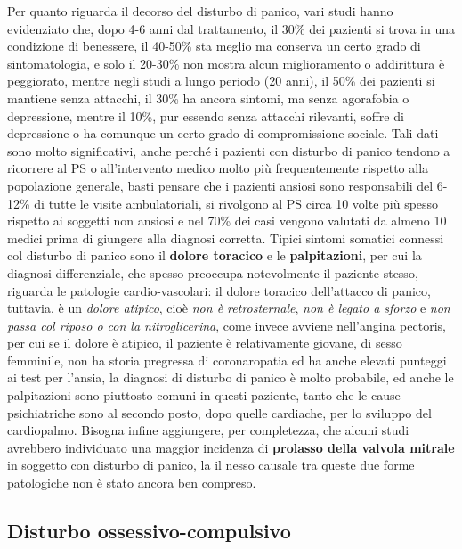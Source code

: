 Per quanto riguarda il decorso del disturbo di panico, vari studi hanno
evidenziato che, dopo 4-6 anni dal trattamento, il 30\% dei pazienti si
trova in una condizione di benessere, il 40-50\% sta meglio ma conserva
un certo grado di sintomatologia, e solo il 20-30\% non mostra alcun
miglioramento o addirittura è peggiorato, mentre negli studi a lungo
periodo (20 anni), il 50\% dei pazienti si mantiene senza attacchi, il
30\% ha ancora sintomi, ma senza agorafobia o depressione, mentre il
10\%, pur essendo senza attacchi rilevanti, soffre di depressione o ha
comunque un certo grado di compromissione sociale. Tali dati sono molto
significativi, anche perché i pazienti con disturbo di panico tendono a
ricorrere al PS o all'intervento medico molto più frequentemente
rispetto alla popolazione generale, basti pensare che i pazienti ansiosi
sono responsabili del 6-12\% di tutte le visite ambulatoriali, si
rivolgono al PS circa 10 volte più spesso rispetto ai soggetti non
ansiosi e nel 70\% dei casi vengono valutati da almeno 10 medici prima
di giungere alla diagnosi corretta. Tipici sintomi somatici connessi col
disturbo di panico sono il \textbf{dolore toracico} e le
\textbf{palpitazioni}, per cui la diagnosi differenziale, che spesso
preoccupa notevolmente il paziente stesso, riguarda le patologie
cardio-vascolari: il dolore toracico dell'attacco di panico, tuttavia, è
un \emph{dolore atipico}, cioè \emph{non è retrosternale}, \emph{non è
legato a sforzo} e \emph{non passa col riposo o con la nitroglicerina},
come invece avviene nell'angina pectoris, per cui se il dolore è
atipico, il paziente è relativamente giovane, di sesso femminile, non ha
storia pregressa di coronaropatia ed ha anche elevati punteggi ai test
per l'ansia, la diagnosi di disturbo di panico è molto probabile, ed
anche le palpitazioni sono piuttosto comuni in questi paziente, tanto
che le cause psichiatriche sono al secondo posto, dopo quelle cardiache,
per lo sviluppo del cardiopalmo. Bisogna infine aggiungere, per
completezza, che alcuni studi avrebbero individuato una maggior
incidenza di \textbf{prolasso della valvola mitrale} in soggetto con
disturbo di panico, la il nesso causale tra queste due forme patologiche
non è stato ancora ben compreso.

\subsection{Disturbo ossessivo-compulsivo}

